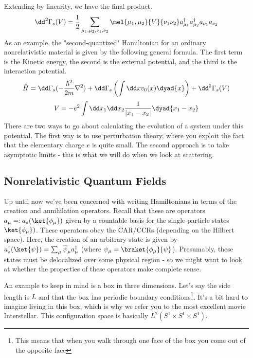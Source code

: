 \documentclass{article}
\begin{document}
Extending by linearity, we have the final product.
\begin{equation}
\dd^2\Gamma_s(V) = \frac{1}{2}\sum_{\mu_1,\mu_2,\nu_1,\nu_2}\mel{\mu_1,\mu_2}{V}{\nu_1\nu_2} a_{\mu_1}^\dagger a_{\mu_2}^\dagger a_{\nu_1} a_{\nu_2}
\end{equation}
\pagebreak
As an example. the "second-quantized" Hamiltonian for an ordinary nonrelativistic material is given by the following general formula. The first term is the Kinetic energy, the second is the external potential, and the third is the interaction potential.
\begin{equation}
\hat H = \dd \Gamma_s(-\frac{\hbar^2}{2m}\nabla^2) + \dd \Gamma_s\left(\int \dd x v_0(x)\dyad{x}\right) + \dd^2\Gamma_s(V)
\end{equation}
\begin{equation}
V = -e^2\int \dd x_1 \dd x_2 \frac{1}{|x_1-x_2|}\dyad{x_1-x_2} 
\end{equation}
There are two ways to go about calculating the evolution of a system under this potential. The first way is to use perturbation theory, where you exploit the fact that the elementary charge $e$ is quite small. The second approach is to take asymptotic limits - this is what we will do when we look at scattering.

\subsection{Nonrelativistic Quantum Fields}
Up until now we've been concerned with writing Hamiltonians in terms of the creation and annihilation operators. Recall that these are operators $a_\mu =: a_s(\ket{\phi_\mu})$ given by a countable basis for the single-particle states $\ket{\phi_\mu})$. These operators obey the CAR/CCRs (depending on the Hilbert space). Here, the creation of an arbitrary state is given by $a^\dagger_s(\ket{\psi}) = \sum_\mu \overline \psi_\mu a_\mu^\dagger$ (where $\psi_\mu = \braket{\phi_\mu}{\psi}$). Presumably, these states must be delocalized over some physical region - so we might want to look at whether the properties of these operators make complete sense.

An example to keep in mind is a box in three dimensions. Let's say the side length is $L$ and that the box has periodic boundary conditions\footnote{This means that when you walk through one face of the box you come out of the opposite face}. It's a bit hard to imagine living in this box, which is why we refer you to the most excellent movie Interstellar. This configuration space is basically $L^2(S^1 \times S^1 \times S^1)$.
\end{document}
